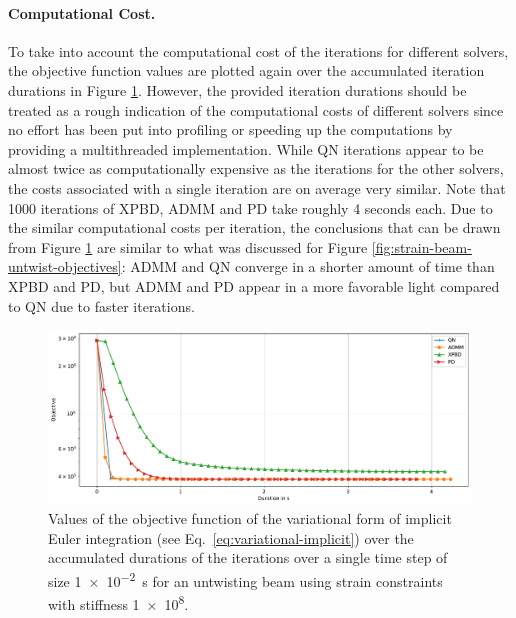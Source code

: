 \paragraph{Computational Cost.}
To take into account the computational cost of the iterations for different solvers, the objective function values are plotted again over the accumulated
iteration durations in Figure \ref{fig:strain-beam-untwist-objectives-time}. However, the provided iteration durations should be treated as a rough indication of the 
computational costs of different solvers since no effort has been put into profiling or speeding up the computations by providing a multithreaded 
implementation. While QN iterations appear to be almost twice as computationally expensive as the iterations 
for the other solvers, the costs associated with a single iteration are on average very similar. Note that 1000 iterations of XPBD, ADMM and PD 
take roughly 4 seconds each. Due to the similar computational costs per iteration, the conclusions that can be drawn from Figure \ref{fig:strain-beam-untwist-objectives-time}
are similar to what was discussed for Figure \ref{fig:strain-beam-untwist-objectives}: ADMM and QN converge in a shorter amount of time than XPBD and PD, but ADMM and PD
appear in a more favorable light compared to QN due to faster iterations.

\begin{figure}[h]
    \includegraphics[width=\textwidth]{figures/strain_beam_untwist_objectives_time.pdf}
    \caption{Values of the objective function of the variational form of implicit Euler integration (see Eq.\ \ref{eq:variational-implicit}) over the accumulated durations of 
        the iterations over a single time step of size \SI{1e-2}{\second} for an untwisting beam using strain constraints with stiffness \num{1e8}.}
    \label{fig:strain-beam-untwist-objectives-time}
\end{figure}

